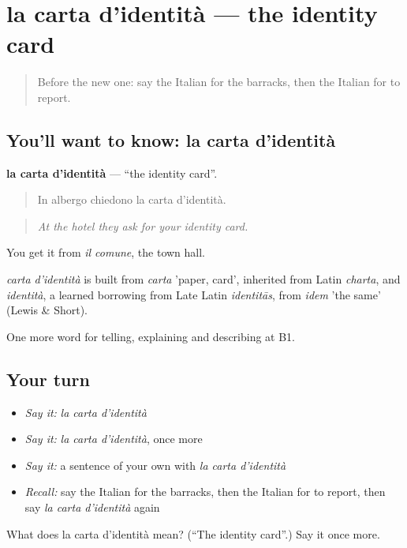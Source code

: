 \section[la carta d'identità]{la carta d'identità — the identity card}

\label{lesson:IT-C447-carta-d-identita}



\begin{quote}
Before the new one: say the Italian for the barracks, then the Italian for to report.
\end{quote}

\subsection*{You'll want to know: la carta d'identità}
\textbf{la carta d'identità} — \textquotedblleft{}the identity card\textquotedblright{}.

\begin{quote}
In albergo chiedono la carta d'identità.
\end{quote}

\begin{quote}
\emph{At the hotel they ask for your identity card.}
\end{quote}

You get it from \emph{il comune}, the town hall.

\begin{cousinweb}
\emph{carta d'identità} is built from \emph{carta} 'paper, card', inherited from Latin \emph{charta}, and \emph{identità}, a learned borrowing from Late Latin \emph{identitās}, from \emph{idem} 'the same' (Lewis \& Short).
\end{cousinweb}

\begin{grammarlens}[title={What you've built}]
One more word for telling, explaining and describing at B1.
\end{grammarlens}

\subsection*{Your turn}
\begin{itemize}
\raggedright
  \item \emph{Say it:} \emph{la carta d'identità}
  \item \emph{Say it:} \emph{la carta d'identità}, once more
  \item \emph{Say it:} a sentence of your own with \emph{la carta d'identità}
  \item \emph{Recall:} say the Italian for the barracks, then the Italian for to report, then say \emph{la carta d'identità} again
\end{itemize}

\begin{tcolorbox}[breakable,colback=teal!4,colframe=teal!35!black,title={Before you move on}]
What does la carta d'identità mean? (\textquotedblleft{}The identity card\textquotedblright{}.) Say it once more.
\end{tcolorbox}

